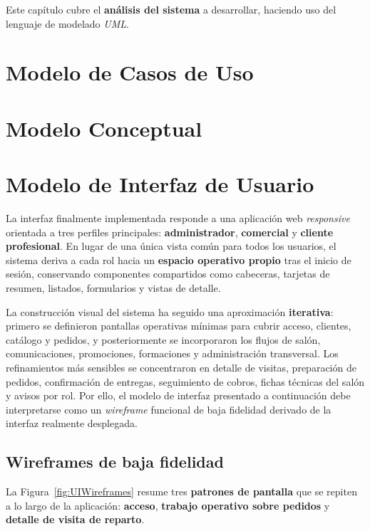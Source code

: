 Este capítulo cubre el \textbf{análisis del sistema} a desarrollar, haciendo uso del lenguaje de modelado \textit{UML}.

\section{Modelo de Casos de Uso}
\label{sec:usecases}


\section{Modelo Conceptual}
\label{sec:conceptualmodel}


\section{Modelo de Interfaz de Usuario}
\label{sec:uiModel}
La interfaz finalmente implementada responde a una aplicación web \textit{responsive} orientada a tres perfiles principales: \textbf{administrador}, \textbf{comercial} y \textbf{cliente profesional}. En lugar de una única vista común para todos los usuarios, el sistema deriva a cada rol hacia un \textbf{espacio operativo propio} tras el inicio de sesión, conservando componentes compartidos como cabeceras, tarjetas de resumen, listados, formularios y vistas de detalle.

La construcción visual del sistema ha seguido una aproximación \textbf{iterativa}: primero se definieron pantallas operativas mínimas para cubrir acceso, clientes, catálogo y pedidos, y posteriormente se incorporaron los flujos de salón, comunicaciones, promociones, formaciones y administración transversal. Los refinamientos más sensibles se concentraron en detalle de visitas, preparación de pedidos, confirmación de entregas, seguimiento de cobros, fichas técnicas del salón y avisos por rol. Por ello, el modelo de interfaz presentado a continuación debe interpretarse como un \textit{wireframe} funcional de baja fidelidad derivado de la interfaz realmente desplegada.

\subsection{Wireframes de baja fidelidad}

La Figura~\ref{fig:UIWireframes} resume tres \textbf{patrones de pantalla} que se repiten a lo largo de la aplicación: \textbf{acceso}, \textbf{trabajo operativo sobre pedidos} y \textbf{detalle de visita de reparto}.

